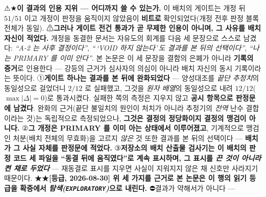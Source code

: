 \documentclass[11pt]{report}
\numberwithin{equation}{chapter}
\numberwithin{figure}{chapter}
\numberwithin{table}{chapter}
\begin{document}
\label{sec:cite-status-m4}%
⚠★\textbf{이 결과의 인용 지위 --- 어디까지 쓸 수 있는가.} 이 배치의 게이트는 개정 뒤
\textbf{$51/51$} 이고 개정이 판정을 움직이지 않았음이 \textbf{비트로} 확인되었다(개정
전후 판정 블록 전체가 동일). ⚠\textbf{그러나 게이트 전건 통과가 곧 무제한 인용이 아니며,
그 사유를 배치 자신이 적었다.} 개정을 동결한 문서는 자유도의 회계를 다음 세 문장으로
스스로 남겼다: \emph{``A-2 는 사후 결정이다''}, \emph{``\,`VOID 하지 않는다'\,도 결과를
본 뒤의 선택이다''}, \emph{``나는 PRIMARY 를 이미 안다''}. 본 논문은 이 세 문장을
결함의 은폐가 아니라 \textbf{기록의 증거}로 인용한다 --- 강등의 근거가 심사자의 의심이
아니라 배치 자신의 동시 기록이라는 뜻이다. ①\textbf{게이트 하나는 결과를 본 뒤에 완화되었다} ---
양성대조를 \emph{끝단 추정치}의 동일성으로 걸었더니 $2/12$ 로 실패했고, 그것을
\emph{원자 배열}의 동일성으로 내려 $12/12$($\max|\Delta| = 0$)로 통과시켰다. 실패한
쪽의 측정은 지우지 않고 \textbf{공시 항목으로 판정문에 남겼다}. 완화의 근거(끝단 불일치의
원인이 처치가 아니라 추정기의 \emph{전역} 난수 결합이라는 것)는 독립적으로 측정되었으나,
\textbf{그것은 결정의 정당화이지 결정의 맹검이 아니다.} ②\textbf{그 개정은 PRIMARY 를
이미 아는 상태에서 이루어졌고}, 기계적으로 맹검인 처분(배치 전체의 무효화)을 고르지
\emph{않은} 것 또한 결과를 본 뒤의 선택이다 --- \textbf{배치가 그 사실 자체를 판정문에
적었다.} ③\textbf{저장소의 배치 산출물 검사기는 이 배치의 판정 코드 세 파일을
``동결 뒤에 움직였다''로 계속 표시하며, 그 표시를 \emph{끈 것이 아니라 켠 채로 두었다}}
--- 재동결로 표시를 지우면 사실이 지워지지 않은 채 신호만 사라지기 때문이다.
★★\textbf{[등급, 2026-08-30] 위 세 가지를 근거로 본 논문은 이 행의 읽기 등급을
확증에서 \emph{탐색(\texttt{EXPLORATORY})}으로 내린다.} ⛔결과가 약해서가 아니다 ---
\end{document}
